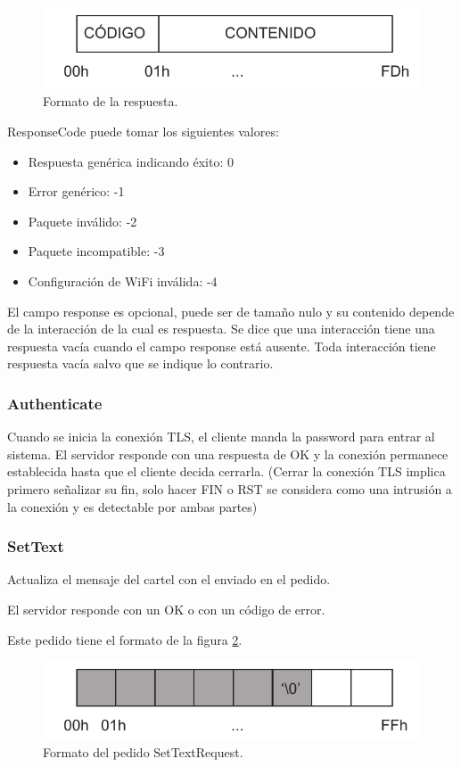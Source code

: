 \begin{figure}[h]
	\centering
	\label{fig:paquete-respuesta}
	\includegraphics[scale=0.8]{imagenes/paquete-respuesta.pdf}
		\caption{Formato de la respuesta.}
\end{figure}


ResponseCode puede tomar los siguientes valores:
\begin{itemize}
	\item Respuesta genérica indicando éxito: 0
	\item Error genérico: -1
	\item Paquete inválido: -2
	\item Paquete incompatible: -3
	\item Configuración de WiFi inválida: -4
\end{itemize}

El campo response es opcional, puede ser de tamaño nulo y su contenido depende de la interacción de la cual es respuesta. Se dice que una interacción tiene una respuesta vacía cuando el campo response está ausente. Toda interacción tiene respuesta vacía salvo que se indique lo contrario.

\subsubsection{Authenticate}
Cuando se inicia la conexión TLS, el cliente manda la password para entrar al sistema. El servidor responde con una respuesta de OK y la conexión permanece establecida hasta que el cliente decida cerrarla. (Cerrar la conexión TLS implica primero señalizar su fin, solo hacer FIN o RST se considera como una intrusión a la conexión y es detectable por ambas partes)

\subsubsection{SetText}
Actualiza el mensaje del cartel con el enviado en el pedido.

El servidor responde con un OK o con un código de error.

Este pedido tiene el formato de la figura \ref{fig:paquete-text}.
\begin{figure}[h]
	\centering
	\label{fig:paquete-text}
	\includegraphics[scale=0.8]{imagenes/paquete-text.pdf}
		\caption{Formato del pedido SetTextRequest.}
\end{figure}

